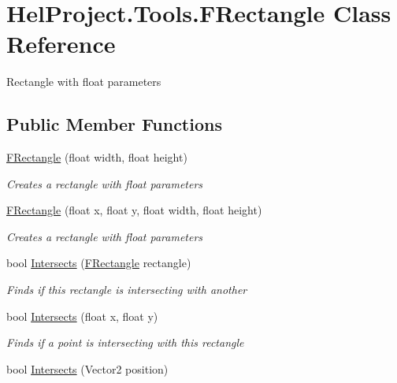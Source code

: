 \hypertarget{class_hel_project_1_1_tools_1_1_f_rectangle}{}\section{Hel\+Project.\+Tools.\+F\+Rectangle Class Reference}
\label{class_hel_project_1_1_tools_1_1_f_rectangle}


Rectangle with float parameters  


\subsection*{Public Member Functions}
\begin{DoxyCompactItemize}
\item 
\hyperlink{class_hel_project_1_1_tools_1_1_f_rectangle_a3da9b75fa9535a7e3bd6ed70d4a29659}{F\+Rectangle} (float width, float height)
\begin{DoxyCompactList}\small\item\em Creates a rectangle with float parameters \end{DoxyCompactList}\item 
\hyperlink{class_hel_project_1_1_tools_1_1_f_rectangle_ab6dd12fc6a5ac36eeab15210891a1b11}{F\+Rectangle} (float x, float y, float width, float height)
\begin{DoxyCompactList}\small\item\em Creates a rectangle with float parameters \end{DoxyCompactList}\item 
bool \hyperlink{class_hel_project_1_1_tools_1_1_f_rectangle_a2019f4db5e6a0da6eb5db3a5be41eecb}{Intersects} (\hyperlink{class_hel_project_1_1_tools_1_1_f_rectangle}{F\+Rectangle} rectangle)
\begin{DoxyCompactList}\small\item\em Finds if this rectangle is intersecting with another \end{DoxyCompactList}\item 
bool \hyperlink{class_hel_project_1_1_tools_1_1_f_rectangle_aad81bdd93b008d00e83698ec1d37158d}{Intersects} (float x, float y)
\begin{DoxyCompactList}\small\item\em Finds if a point is intersecting with this rectangle \end{DoxyCompactList}\item 
bool \hyperlink{class_hel_project_1_1_tools_1_1_f_rectangle_a92993f4e29ac4fb482aa7863b3c49d12}{Intersects} (Vector2 position)

\end{DoxyCompactItemize}
